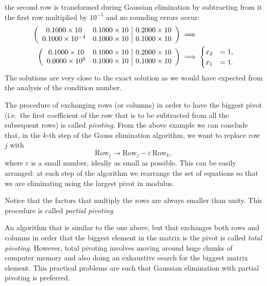 the second row is transformed during Gaussian elimination by
subtracting from it the first row multiplied by $10^{-5}$ and no
rounding errors occur:
%
\begin{align}
  \left (
    \begin{array}{c c|c}
      0.1000 \times 10 & 0.1000 \times 10 & 0.2000 \times 10 \\
      0.1000 \times 10^{-4} & 0.1000 \times 10 & 0.1000 \times 10
    \end{array}
  \right ) & \implies \\
  \left (
    \begin{array}{c c|c}
      0.1000 \times 10 & 0.1000 \times 10 & 0.2000 \times 10 \\
      0.0000 \times 10^{0} & 0.1000 \times 10 & 0.1000 \times 10 
    \end{array}
  \right ) & \implies
  \begin{cases}
    x_2 &= 1, \\ x_1 &= 1 .
  \end{cases}
\end{align}
%
The solutions are very close to the exact solution as we would have
expected from the analysis of the condition number.    

The procedure of  exchanging rows  (or columns) in  order  to have the
biggest pivot  (i.e.\ the first  coefficient of the  row that is  to be
subtracted from all the  subsequent rows) is called \textit{pivoting}.
From the above example we can conclude that, in the $k$-th step of the
Gauss elimination algorithm, we want to replace row $j$ with
%
\begin{equation*}
  \text{Row}_j \rightarrow \text{Row}_j - \varepsilon \, \text{Row}_k,
\end{equation*}
%
where $\varepsilon$ is a small number, ideally as small as possible.
This can be easily arranged: at each step of the algorithm we
rearrange the set of equations so that we are eliminating using the
largest pivot in modulus.  

Notice that the factors that multiply the rows are always smaller than
unity.    This procedure is called \textit{partial pivoting}.    

An algorithm that is similar to the one above, but that exchanges both
rows and columns in order that the biggest element in the matrix is
the pivot is called \textit{total pivoting}.  However, total pivoting
involves moving around huge chunks of computer memory and also doing
an exhaustive search for the biggest matrix element.  This practical
problems are such that Gaussian elimination with partial pivoting
is preferred.

